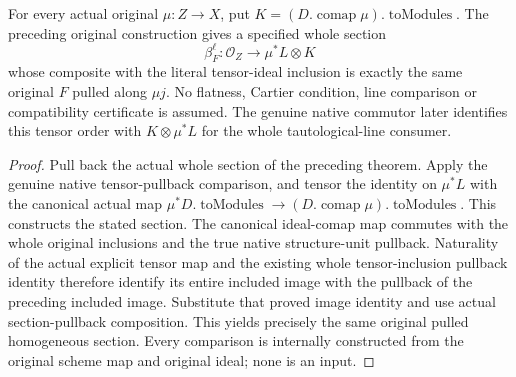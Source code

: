 \begin{theorem}
\label{thm:resume-pulled-original-form-ideal-tensor-section}
\leanok
For every actual original $\mu:Z\to X$, put
$K=(D.\operatorname{comap}\mu).\operatorname{toModules}$.
The preceding original construction gives a specified whole section
\[
 \beta_F^{\ell}:\mathcal O_Z\longrightarrow\mu^*L\otimes K
\]
whose composite with the literal tensor-ideal inclusion is exactly the
same original $F$ pulled along $\mu j$.  No flatness, Cartier condition,
line comparison or compatibility certificate is assumed.
The genuine native commutor later identifies this tensor order with
$K\otimes\mu^*L$ for the whole tautological-line consumer.
\end{theorem}
\begin{proof}
Pull back the actual whole section of the preceding theorem.  Apply
the genuine native tensor-pullback comparison, and tensor the identity
on $\mu^*L$ with the canonical actual map
$\mu^*D.\operatorname{toModules}\to
 (D.\operatorname{comap}\mu).\operatorname{toModules}$.
This constructs the stated section.  The canonical ideal-comap map
commutes with the whole original inclusions and the true native
structure-unit pullback.  Naturality of the actual explicit tensor map
and the existing whole tensor-inclusion pullback identity therefore
identify its entire included image with the pullback of the preceding
included image.  Substitute that proved image identity and use actual
section-pullback composition.  This yields precisely the same original
pulled homogeneous section.  Every comparison is internally constructed
from the original scheme map and original ideal; none is an input.
\end{proof}
